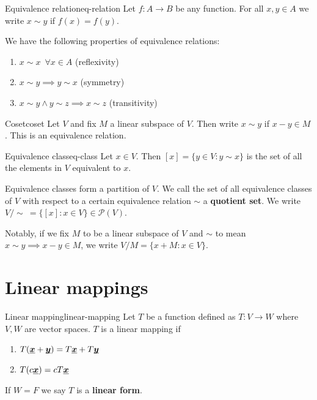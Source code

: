 \documentclass[12pt]{extarticle}
\renewcommand{\vec}[1]{\uvec{#1}}
\begin{document}
\begin{definition}{Equivalence relation}{eq-relation}
    Let $f:A \to B$ be any function. For all $x, y \in A$ we write $x \sim y$ if $f(x) = f(y)$.
\end{definition}

We have the following properties of equivalence relations:
\begin{enumerate}
    \item $x \sim x \enspace \forall x \in A$ (reflexivity)
    \item $x \sim y \implies y \sim x$ (symmetry)
    \item $x\sim y \land y\sim z \implies x \sim z$ (transitivity)
\end{enumerate}

\begin{example}{Coset}{coset}
    Let $V$ and fix $M$ a linear subspace of $V$. Then write $x \sim y$ if $x-y \in M$. This is an equivalence relation.
\end{example}

\begin{definition}{Equivalence class}{eq-class}
    Let $x \in V$. Then $[x] = \{y \in V: y \sim x\}$ is the set of all the elements in $V$ equivalent to $x$.
\end{definition}

Equivalence classes form a partition of $V$.
We call the set of all equivalence classes of $V$ with respect to a certain equivalence relation $\sim$ a \textbf{quotient set}.
We write $V/\sim \ = \{[x]: x \in V\} \in \mathscr P(V)$.

Notably, if we fix $M$ to be a linear subspace of $V$ and $\sim$ to mean $x \sim y \implies x - y \in M$, we write $V/M = \{ x + M : x \in V \}$.

\section{Linear mappings}

\begin{definition}{Linear mapping}{linear-mapping}
    Let $T$ be a function defined as $T: V \to W$ where $V, W$ are vector spaces.
    $T$ is a linear mapping if
    \begin{enumerate}
        \item $T(\vec x+\vec y) = T\vec x + T\vec y$
        \item $T(c\vec x) = cT\vec x$
    \end{enumerate}

    If $W = F$ we say $T$ is a \textbf{linear form}.
\end{definition}
\end{document}
